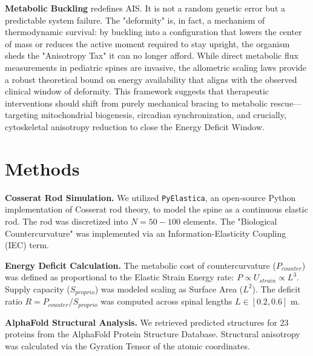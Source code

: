 \documentclass[11pt]{article}
\begin{document}
\textbf{Metabolic Buckling} redefines AIS. It is not a random genetic error but a predictable system failure. The "deformity" is, in fact, a mechanism of thermodynamic survival: by buckling into a configuration that lowers the center of mass or reduces the active moment required to stay upright, the organism sheds the "Anisotropy Tax" it can no longer afford. While direct metabolic flux measurements in pediatric spines are invasive, the allometric scaling laws provide a robust theoretical bound on energy availability that aligns with the observed clinical window of deformity. This framework suggests that therapeutic interventions should shift from purely mechanical bracing to metabolic rescue---targeting mitochondrial biogenesis, circadian synchronization, and crucially, cytoskeletal anisotropy reduction to close the Energy Deficit Window.

\section*{Methods}

\textbf{Cosserat Rod Simulation.} We utilized \texttt{PyElastica}\cite{pyelastica_zenodo}, an open-source Python implementation of Cosserat rod theory, to model the spine as a continuous elastic rod. The rod was discretized into $N=50-100$ elements. The "Biological Countercurvature" was implemented via an Information-Elasticity Coupling (IEC) term.

\textbf{Energy Deficit Calculation.} The metabolic cost of countercurvature ($P_{counter}$) was defined as proportional to the Elastic Strain Energy rate: $P \propto U_{strain} \propto L^3$. Supply capacity ($S_{proprio}$) was modeled scaling as Surface Area ($L^2$). The deficit ratio $R = P_{counter} / S_{proprio}$ was computed across spinal lengths $L \in [0.2, 0.6]$ m.

\textbf{AlphaFold Structural Analysis.} We retrieved predicted structures for 23 proteins from the AlphaFold Protein Structure Database\cite{jumper2021alphafold}. Structural anisotropy was calculated via the Gyration Tensor of the atomic coordinates.



\end{document}
